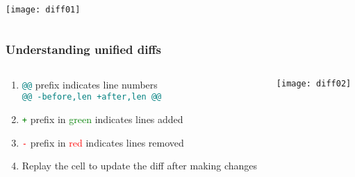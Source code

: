 \documentclass[
	notes=none,
	aspectratio=169
]{beamer}
\begin{document}

\begin{frame}
\frametitle{}

\begin{columns}[T]
\begin{column}[T]{1.0\textwidth}
\setlength{\parskip}{0.5em}

\vspace{0.0cm}
\texttt{[image: diff01]}


\end{column}
\end{columns}

\end{frame}
\note{
}


\begin{frame}
\frametitle{Understanding unified diffs}

\begin{columns}[T]
\begin{column}[T]{0.6\textwidth}
\setlength{\parskip}{0.5em}

\vspace{0.5cm}
\begin{enumerate}
\setlength{\parskip}{0.5em}
\item \textcolor{teal}{\tt @@} prefix indicates line numbers \\\textcolor{teal}{\tt @@ -before,len +after,len @@}
\item \textcolor{green}{\tt +} prefix in \textcolor{green}{green} indicates lines added
\item \textcolor{red}{\tt -} prefix in \textcolor{red}{red} indicates lines removed
\item Replay the cell to update the diff after making changes
\end{enumerate}

\end{column}
\begin{column}[T]{0.3\textwidth}
\setlength{\parskip}{0.5em}

\vspace{0.0cm}
\texttt{[image: diff02]}

\end{column}
\end{columns}

\end{frame}
\note{
}

\end{document}
